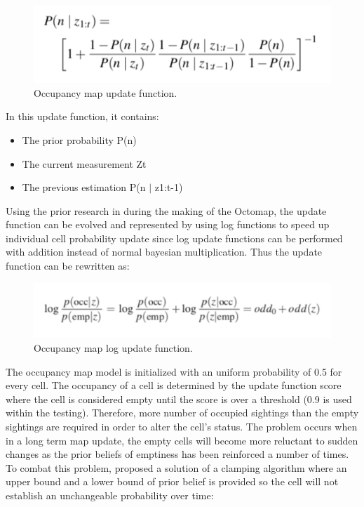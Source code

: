 \documentclass[11pt]{article}
\begin{document}
\begin{figure}[H]
    \centering
        \includegraphics[scale=.3, angle =0]{figures/prob-1.png}
    \caption{Occupancy map update function.}
    \label{me}
\end{figure}

In this update function, it contains:
\begin{itemize}
	\item The prior probability P(n)
    \item The current measurement Zt 
    \item The previous estimation P(n $|$ z1:t-1)
\end{itemize}

Using the prior research in \cite{2} during the making of the Octomap, the update function can be evolved and represented by using log functions to speed up individual cell probability update since log update functions can be performed with addition instead of normal bayesian multiplication. Thus the update function can be rewritten as:

\begin{figure}[H]
    \centering
        \includegraphics[scale=.4, angle =0]{figures/prob-2.png}
    \caption{Occupancy map log update function.}
    \label{me}
\end{figure}


The occupancy map model is initialized with an uniform probability of 0.5 for every cell. The occupancy of a cell is determined by the update function score where the cell is considered empty until the score is over a threshold (0.9 is used within the testing). Therefore, more number of occupied sightings than the empty sightings are required in order to alter the cell’s status. The problem occurs when in a long term map update, the empty cells will become more reluctant to sudden changes as the prior beliefs of emptiness has been reinforced a number of times. To combat this problem, \cite{3} proposed a solution of a clamping algorithm where an upper bound and a lower bound of prior belief is provided so the cell will not establish an unchangeable probability over time:
\end{document}
